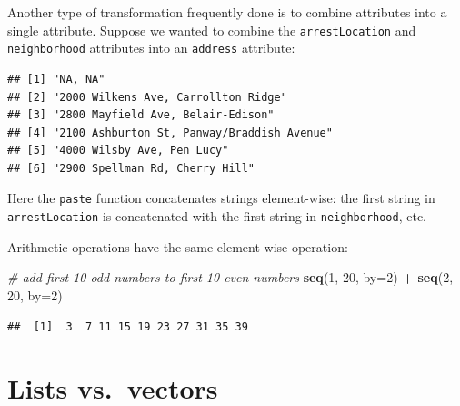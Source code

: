 \documentclass[12pt,]{book}
\newenvironment{Shaded}{\begin{snugshade}}{\end{snugshade}}
\newcommand{\KeywordTok}[1]{\textcolor[rgb]{0.13,0.29,0.53}{\textbf{#1}}}
\newcommand{\DataTypeTok}[1]{\textcolor[rgb]{0.13,0.29,0.53}{#1}}
\newcommand{\DecValTok}[1]{\textcolor[rgb]{0.00,0.00,0.81}{#1}}
\newcommand{\StringTok}[1]{\textcolor[rgb]{0.31,0.60,0.02}{#1}}
\newcommand{\CommentTok}[1]{\textcolor[rgb]{0.56,0.35,0.01}{\textit{#1}}}
\newcommand{\OperatorTok}[1]{\textcolor[rgb]{0.81,0.36,0.00}{\textbf{#1}}}
\newcommand{\NormalTok}[1]{#1}
\theoremstyle{definition}
\theoremstyle{definition}
\theoremstyle{remark}
\begin{document}
Another type of transformation frequently done is to combine attributes
into a single attribute. Suppose we wanted to combine the
\texttt{arrestLocation} and \texttt{neighborhood} attributes into an
\texttt{address} attribute:

\begin{Shaded}
\end{Shaded}

\begin{verbatim}
## [1] "NA, NA"                                   
## [2] "2000 Wilkens Ave, Carrollton Ridge"       
## [3] "2800 Mayfield Ave, Belair-Edison"         
## [4] "2100 Ashburton St, Panway/Braddish Avenue"
## [5] "4000 Wilsby Ave, Pen Lucy"                
## [6] "2900 Spellman Rd, Cherry Hill"
\end{verbatim}

Here the \texttt{paste} function concatenates strings element-wise: the
first string in \texttt{arrestLocation} is concatenated with the first
string in \texttt{neighborhood}, etc.

Arithmetic operations have the same element-wise operation:

\begin{Shaded}
\begin{Highlighting}[]
\CommentTok{# add first 10 odd numbers to first 10 even numbers}
\KeywordTok{seq}\NormalTok{(}\DecValTok{1}\NormalTok{, }\DecValTok{20}\NormalTok{, }\DataTypeTok{by=}\DecValTok{2}\NormalTok{) }\OperatorTok{+}\StringTok{ }\KeywordTok{seq}\NormalTok{(}\DecValTok{2}\NormalTok{, }\DecValTok{20}\NormalTok{, }\DataTypeTok{by=}\DecValTok{2}\NormalTok{)}
\end{Highlighting}
\end{Shaded}

\begin{verbatim}
##  [1]  3  7 11 15 19 23 27 31 35 39
\end{verbatim}

\section{Lists vs.~vectors}\label{lists-vs.vectors}
\end{document}
